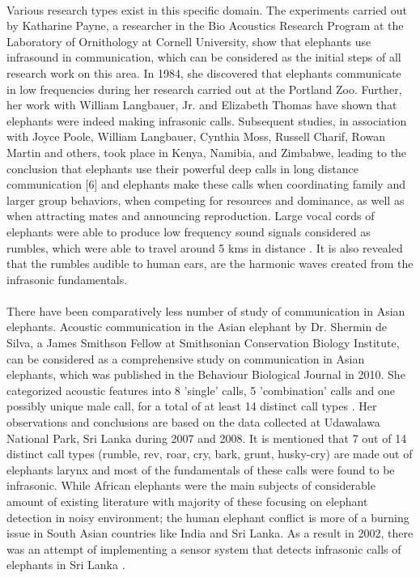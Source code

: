 \documentclass[12pt]{article}
\numberwithin{figure}{section}
\numberwithin{table}{section}
\begin{document}
\paragraph{}
Various research types exist in this specific domain. The experiments carried out by Katharine Payne, a researcher in the Bio Acoustics Research Program at the Laboratory of Ornithology at Cornell University, show that elephants use infrasound in communication, which can be considered as the initial steps of all research work on this area. In 1984, she discovered that elephants communicate in low frequencies during her research carried out at the Portland Zoo. Further, her work with William Langbauer, Jr. and Elizabeth Thomas have shown that elephants were indeed making infrasonic calls. Subsequent studies, in association with Joyce Poole, William Langbauer, Cynthia Moss, Russell Charif, Rowan Martin and others, took place in Kenya, Namibia, and Zimbabwe, leading to the conclusion that elephants use their powerful deep calls in long distance communication [6] and elephants make these calls when coordinating family and larger group behaviors, when competing for resources and dominance, as well as when attracting mates and announcing reproduction. Large vocal cords of elephants were able to produce low frequency sound signals considered as rumbles, which were able to travel around 5 kms in distance \cite {6}. It is also revealed that the rumbles audible to human ears, are the harmonic waves created from the infrasonic fundamentals.


\paragraph{}
There have been comparatively less number of study of communication in Asian elephants. Acoustic communication in the Asian elephant by Dr. Shermin de Silva, a  James Smithson Fellow at Smithsonian Conservation Biology Institute, can be considered as a comprehensive study on communication in Asian elephants, which was published in the Behaviour Biological Journal in 2010. She categorized acoustic features into 8 'single' calls, 5 'combination' calls and one possibly unique male call, for a total of at least 14 distinct call types \cite {19}. Her observations and conclusions are based on the data collected at Udawalawa National Park, Sri Lanka during 2007 and 2008. It is mentioned that 7 out of 14 distinct call types (rumble, rev, roar, cry, bark, grunt, husky-cry) are made out of elephants larynx and most of the fundamentals of these calls were found to be infrasonic. While African elephants were the main subjects of considerable amount of existing literature with majority of these focusing on elephant detection in noisy environment; the human elephant conflict is more of a burning issue in South Asian countries like India and Sri Lanka. As a result in 2002, there was an attempt of implementing a sensor system that detects infrasonic calls of elephants in Sri Lanka \cite{13}.
\end{document}

